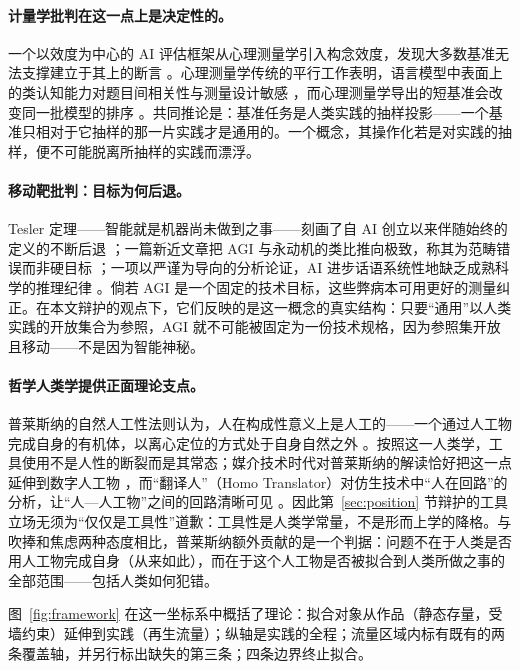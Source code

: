 \documentclass[10pt,fontset=fandol]{ctexart}
\begin{document}
\paragraph{计量学批判在这一点上是决定性的。}
一个以效度为中心的 AI 评估框架从心理测量学引入构念效度，发现大多数基准无法支撑建立于其上的断言 \cite{salaudeen2025measurement}。心理测量学传统的平行工作表明，语言模型中表面上的类认知能力对题目间相关性与测量设计敏感 \cite{ilic2024evidence}，而心理测量学导出的短基准会改变同一批模型的排序 \cite{gignac2025psychometrically}。共同推论是：基准任务是人类实践的抽样投影——一个基准只相对于它抽样的那一片实践才是通用的。一个概念，其操作化若是对实践的抽样，便不可能脱离所抽样的实践而漂浮。

\paragraph{移动靶批判：目标为何后退。}
Tesler 定理——智能就是机器尚未做到之事——刻画了自 AI 创立以来伴随始终的定义的不断后退 \cite{tesler1997effect}；一篇新近文章把 AGI 与永动机的类比推向极致，称其为范畴错误而非硬目标 \cite{imeri2025benefits}；一项以严谨为导向的分析论证，AI 进步话语系统性地缺乏成熟科学的推理纪律 \cite{nguyen2026rigor}。倘若 AGI 是一个固定的技术目标，这些弊病本可用更好的测量纠正。在本文辩护的观点下，它们反映的是这一概念的真实结构：只要“通用”以人类实践的开放集合为参照，AGI 就不可能被固定为一份技术规格，因为参照集开放且移动——不是因为智能神秘。

\paragraph{哲学人类学提供正面理论支点。}
普莱斯纳的自然人工性法则认为，人在构成性意义上是人工的——一个通过人工物完成自身的有机体，以离心定位的方式处于自身自然之外 \cite{plessner1928levels}。按照这一人类学，工具使用不是人性的断裂而是其常态；媒介技术时代对普莱斯纳的解读恰好把这一点延伸到数字人工物 \cite{demul2014philosophical}，而“翻译人”（Homo Translator）对仿生技术中“人在回路”的分析，让“人—人工物”之间的回路清晰可见 \cite{tamborini2025homo}。因此第~\ref{sec:position} 节辩护的工具立场无须为“仅仅是工具性”道歉：工具性是人类学常量，不是形而上学的降格。与吹捧和焦虑两种态度相比，普莱斯纳额外贡献的是一个判据：问题不在于人类是否用人工物完成自身（从来如此），而在于这个人工物是否被拟合到人类所做之事的全部范围——包括人类如何犯错。

图~\ref{fig:framework} 在这一坐标系中概括了理论：拟合对象从作品（静态存量，受墙约束）延伸到实践（再生流量）；纵轴是实践的全程；流量区域内标有既有的两条覆盖轴，并另行标出缺失的第三条；四条边界终止拟合。
\end{document}
